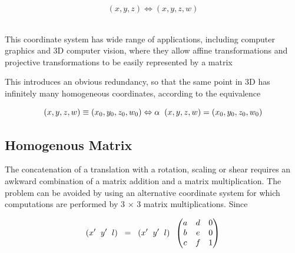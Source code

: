 \documentclass[12pt]{report}
\begin{document}
\begin{center} 
\[ ( x , y , z ) \Leftrightarrow ( x , y , z , w ) \]
\end{center}
\\
\vspace{.3cm}
This coordinate system has wide range of applications, including computer graphics and 3D computer vision, where they allow affine transformations and projective transformations to be easily represented by a matrix
\\
\vspace{.3cm}

This introduces an obvious redundancy, so that the same point in 3D has infinitely many homogeneous coordinates, according to the equivalence
\\
\vspace{.3cm}

\begin{center} 
\[ (x, y, z, w) \equiv (x_{0}, y_{0}, z_{0}, w_{0})   \Leftrightarrow \alpha \hspace{0.2cm} (x, y, z, w) = (x_{0}, y_{0}, z_{0}, w_{0}) \]
\end{center}


\subsection{Homogenous Matrix}

\noindent The concatenation of a translation with a rotation, scaling or shear requires an awkward combination of a matrix addition and a matrix multiplication. The problem can be avoided by using an alternative coordinate system for which computations are performed by 3 × 3 matrix multiplications. Since 

\begin{center}
\[ (x' \hspace{.2cm}  y' \hspace{.2cm}  l ) \hspace{.2cm} = \hspace{.2cm} (x' \hspace{.2cm}  y' \hspace{.2cm} l )    \hspace{0.2cm} \begin{pmatrix}
a & d & 0 \\
b & e & 0 \\
c & f & 1 
\end{pmatrix} \]
  
\end{center}
\end{document}
